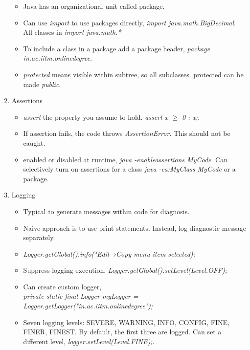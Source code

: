 \documentclass[a4paper]{article}
\begin{document}
\begin{enumerate}
\begin{itemize}
        \item Java has an organizational unit called package.
        \item Can use \textit{import} to use packages directly, \textit{import java.math.BigDecimal}. All classes in \textit{import java.math.*}
        \item To include a class in a package add a package header, \textit{package in.ac.iitm.onlinedegree}.
        \item \textit{protected} means visible within subtree, so all subclasses. protected can be made \textit{public}.
    \end{itemize}
    \item Assertions
    \begin{itemize}
        \item \textit{assert} the property you assume to hold. \textit{assert x $\geq$ 0 : x;}.
        \item If assertion fails, the code throws \textit{AssertionError}. This should not be caught.
        \item enabled or disabled at runtime, \textit{java -enableassertions MyCode}. Can selectively turn on assertions for a class \textit{java -ea:MyClass MyCode} or a package.
    \end{itemize}
    \item Logging
    \begin{itemize}
        \item Typical to generate messages within code for diagnosis.
        \item Naive approach is to use print statements. Instead, log diagnostic message separately.
        \item \textit{Logger.getGlobal().info("Edit→Copy menu item selected);}
        \item Suppress logging execution, \textit{Logger.getGlobal().setLevel(Level.OFF);}
        \item Can create custom logger,\\
        \textit{private static final Logger myLogger = Logger.getLogger("in.ac.iitm.onlinedegree");}
        \item Seven logging levels: SEVERE, WARNING, INFO, CONFIG, FINE, FINER, FINEST. By default, the first three are logged. Can set a different level, \textit{logger.setLevel(Level.FINE);}.
    \end{itemize}
\end{enumerate}
\end{document}
